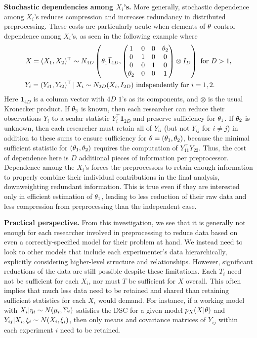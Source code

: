 \medskip
\noindent
{\bf Stochastic dependencies among $X_i$'s.} More generally,  stochastic  dependence among $X_i$'s    reduces compression and increases redundancy in distributed preprocessing.
These costs are particularly acute when elements of $\theta$ control dependence among $X_i$'s, as seen in the following example where
\begin{align}
 \nonumber
 X = (X_1, X_2)^\top &\sim N_{4D}\left(\theta_1 \vec 1_{4D},  \begin{pmatrix} 
1 & 0 & 0 & \theta_2 \\
0 & 1 & 0 & 0 \\
0 & 0 & 1 & 0 \\
\theta_2 & 0 & 0 & 1
\end{pmatrix} \otimes I_{D} \right)\mbox{ for }D > 1, \\
 \nonumber
 Y_i = (Y_{i1}, Y_{i2})^\top &\, | \, X_i\sim N_{2D}(X_i, I_{2D})  \mbox{ independently for\ } i=1,2.
\end{align}
Here $\bm 1_{4D}$ is a column vector with $4D$ $1$'s as its components, and $\otimes$ is the usual Kronecker product.  
If $\theta_2$ is known, then each researcher can reduce their observations $Y_i$ to a scalar statistic $Y_i^\top \bm 1_{2D}$ and preserve sufficiency for $\theta_1$.
If $\theta_2$ is unknown, then each researcher must retain all of $Y_{ii}$ (but not $Y_{ij}$ for $i\not=j$) in addition to these sums to ensure sufficiency for $\theta = (\theta_1, \theta_2)$, because the minimal sufficient statistic for $(\theta_1, \theta_2)$ requires the computation of $Y_{11}^\top Y_{22}$.
Thus, the cost of dependence here is $D$ additional pieces of information per preprocessor.
%
Dependence among the $X_i$'s forces the preprocessors to retain enough information to properly combine their individual contributions in the final analysis, downweighting redundant information.
This is true even if they are interested only in efficient estimation of $\theta_1$, leading to less reduction of their raw data and less compression from preprocessing than the independent case.


\medskip
\noindent
{\bf Practical perspective.}
From this investigation, we see that it is generally not enough for each researcher involved in preprocessing to reduce data based on even a correctly-specified model for their problem at hand.
We instead need to look to other models that include each experimenter's data hierarchically, explicitly considering higher-level structure and relationships.
However, significant reductions of the data are still possible despite these limitations.
Each $T_i$ need not be sufficient for each $X_i$, nor must $T$ be sufficient for $X$ overall.
This often implies that much less data need to be retained and shared than  retaining sufficient statistics for each $X_i$ would demand.
For instance, if a working model with $X_i | \eta_i \sim N(\mu_i, \Sigma_i)$ satisfies the DSC for a given model $p_X(X | \theta)$ and $Y_{ij} | X_i, \xi_i \sim N(X_i, \xi_i)$, then only means and covariance matrices of $Y_{ij}$ within each experiment $i$ need to be retained.


